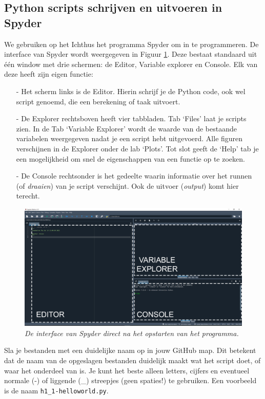 \documentclass[a4paper,11pt, fleqn]{article}
\begin{document}
\subsection{Python scripts schrijven en uitvoeren in Spyder}
We gebruiken op het Ichthus het programma Spyder om in te programmeren. De interface van Spyder wordt weergegeven in Figuur \ref{fig-spyder}. Deze bestaat standaard uit \'e\'en window met drie schermen: de Editor, Variable explorer en Console. Elk van deze heeft zijn eigen functie:
\begin{itemize}
\item[-] Het scherm links is de Editor. Hierin schrijf je de Python code, ook wel script genoemd, die een berekening of taak uitvoert. 
\item[-] De Explorer rechtsboven heeft vier tabbladen. Tab `Files' laat je scripts zien. In de Tab `Variable Explorer' wordt de waarde van de bestaande variabelen weergegeven nadat je een script hebt uitgevoerd. Alle figuren verschijnen in de Explorer onder de lab `Plots'. Tot slot geeft de `Help' tab je een mogelijkheid om snel de eigenschappen van een functie op te zoeken.
\item[-] De Console rechtsonder is het gedeelte waarin informatie over het runnen (of \textit{draaien}) van je script verschijnt. Ook de uitvoer (\textit{output}) komt hier terecht.
\end{itemize}

\begin{figure}[h]
\includegraphics[width=16cm]{fig/spyder_screenshot.png}
\caption{\it De interface van Spyder direct na het opstarten van het programma.}
\label{fig-spyder}
\end{figure}

Sla je bestanden met een duidelijke naam op in jouw GitHub map. Dit betekent dat de naam van de opgeslagen bestanden duidelijk maakt wat het script doet, of waar het onderdeel van is. Je kunt het beste alleen letters, cijfers en eventueel normale (-) of liggende (\_) streepjes (geen spaties!) te gebruiken. Een voorbeeld is de naam \verb,h1_1-helloworld.py,.
\end{document}
